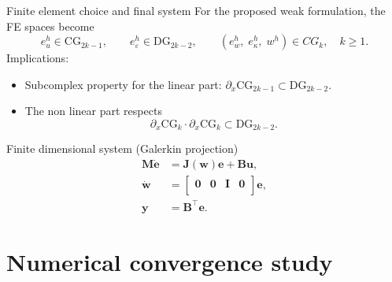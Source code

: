 \documentclass[serif]{beamer} %
\begin{document}
\begin{frame}{Finite element choice and final system}
	For the proposed weak formulation, the FE spaces become
	\begin{equation*}
			e_u^h \in \mathrm{CG}_{2k-1}, \qquad
			e_{\varepsilon}^h \in \mathrm{DG}_{2k-2}, \qquad 
			(e_w^h, \; e_\kappa^h, \; w^h) \in CG_{k}, \quad k\ge 1.
	\end{equation*}
Implications:
\begin{itemize}
	\item Subcomplex property for the linear part: $\partial_x \mathrm{CG}_{2k-1} \subset \mathrm{DG}_{2k-2}$.
	\item The non linear part respects
	$$\partial_x \mathrm{CG}_k \cdot  \partial_x \mathrm{CG}_k \subset \mathrm{DG}_{2k-2}.$$
\end{itemize}

\begin{block}{Finite dimensional system (Galerkin projection)}
		\begin{equation*}
		\begin{aligned}
			\mathbf{M} \dot{\mathbf{e}} &= \mathbf{J}(\mathbf{w})\mathbf{e} + \mathbf{B}\mathbf{u}, \\
			\dot{\mathbf{w}} &= \begin{bmatrix}
				\mathbf{0} & \mathbf{0} & \mathbf{I} & \mathbf{0} \\
			\end{bmatrix} \mathbf{e}, \\
			\mathbf{y} &= \mathbf{B}^\top \mathbf{e}.
		\end{aligned}
	\end{equation*}
\end{block}

\end{frame}


\section{Numerical convergence study}
\end{document}
